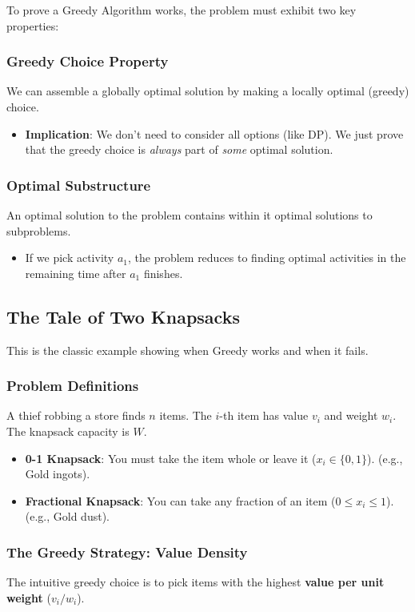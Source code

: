 \documentclass[12pt]{article}
\theoremstyle{blueplain}
\theoremstyle{bluedef}
\theoremstyle{blueremark}
\begin{document}
To prove a Greedy Algorithm works, the problem must exhibit two key properties:

\subsubsection{Greedy Choice Property}
We can assemble a globally optimal solution by making a locally optimal (greedy) choice.
\begin{itemize}
    \item \textbf{Implication}: We don't need to consider all options (like DP). We just prove that the greedy choice is \textit{always} part of \textit{some} optimal solution.
\end{itemize}

\subsubsection{Optimal Substructure}
An optimal solution to the problem contains within it optimal solutions to subproblems.
\begin{itemize}
    \item If we pick activity $a_1$, the problem reduces to finding optimal activities in the remaining time after $a_1$ finishes.
\end{itemize}

\subsection{The Tale of Two Knapsacks}

This is the classic example showing when Greedy works and when it fails.

\subsubsection{Problem Definitions}
A thief robbing a store finds $n$ items. The $i$-th item has value $v_i$ and weight $w_i$. The knapsack capacity is $W$.
\begin{itemize}
    \item \textbf{0-1 Knapsack}: You must take the item whole or leave it ($x_i \in \{0, 1\}$). (e.g., Gold ingots).
    \item \textbf{Fractional Knapsack}: You can take any fraction of an item ($0 \le x_i \le 1$). (e.g., Gold dust).
\end{itemize}

\subsubsection{The Greedy Strategy: Value Density}
The intuitive greedy choice is to pick items with the highest \textbf{value per unit weight} ($v_i / w_i$).
\end{document}
